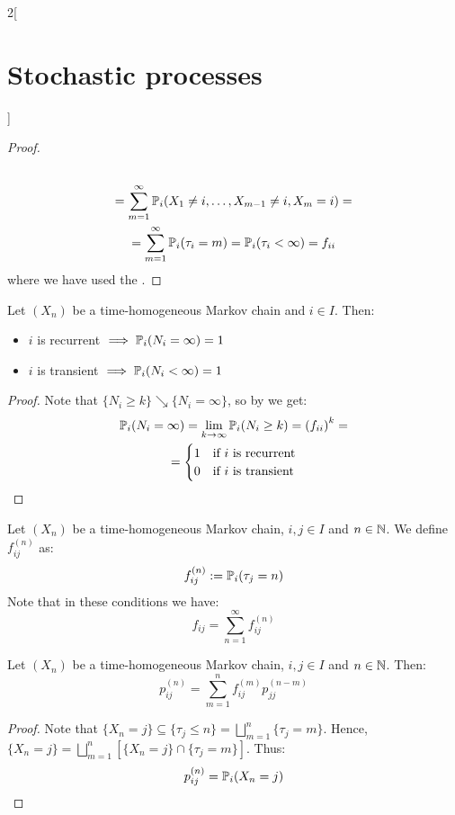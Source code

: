 \documentclass[../../../main_math.tex]{subfiles}
\begin{document}
\begin{multicols}{2}[\section{Stochastic processes}]
\begin{proof}
\begin{multline*}
      \\=\sum_{m=1}^{\infty}\mathbb{P}_i( X_{1}\ne i,\ldots,X_{m-1}\ne i,X_{m}=i)=\\=\sum_{m=1}^{\infty}\mathbb{P}_i(\tau_i=m)=\mathbb{P}_i(\tau_i<\infty)=f_{ii}
    \end{multline*}
    where we have used the .
  \end{proof}
  \begin{theorem}
    Let $(X_n)$ be a time-homogeneous Markov chain and $i\in I$. Then:
    \begin{itemize}
      \item $i$ is recurrent $\implies\mathbb{P}_i(N_i=\infty)=1$
      \item $i$ is transient $\implies\mathbb{P}_i(N_i<\infty)=1$
    \end{itemize}
  \end{theorem}
  \begin{proof}
    Note that $\{N_i\geq k\}\searrow\{N_i=\infty\}$, so by  we get:
    \begin{multline*}
      \mathbb{P}_i(N_i=\infty)=\lim_{k\to\infty}\mathbb{P}_i(N_i\geq k)={(f_{ii})}^k=\\=\begin{cases}
        1 & \text{if }i\text{ is recurrent} \\
        0 & \text{if }i\text{ is transient}
      \end{cases}
    \end{multline*}
  \end{proof}
  \begin{definition}
    Let $(X_n)$ be a time-homogeneous Markov chain, $i, j\in I$ and $n\in\mathbb{N}$. We define $f_{ij}^{(n)}$ as:
    $$f_{ij}^{(n)}:=\mathbb{P}_i(\tau_j=n)$$
    Note that in these conditions we have:
    $$
      f_{ij}=\sum_{n=1}^{\infty}f_{ij}^{(n)}
    $$
  \end{definition}
  \begin{proposition}\label{SP:pij-fij}
    Let $(X_n)$ be a time-homogeneous Markov chain, $i, j\in I$ and $n\in\mathbb{N}$. Then:
    $$
      p_{ij}^{(n)}=\sum_{m=1}^{n} f_{ij}^{(m)}p_{jj}^{(n-m)}
    $$
  \end{proposition}
  \begin{proof}
    Note that $\{X_n=j\}\subseteq \{\tau_j\leq n\}=\bigsqcup_{m=1}^n\{\tau_j=m\}$. Hence, $\{X_n=j\}=\bigsqcup_{m=1}^n[\{X_n=j\}\cap \{\tau_j=m\}]$. Thus:
    \begin{align*}
      p_{ij}^{(n)} & =\Prob_i(X_n=j)                                              \\

\end{align*}
\end{proof}
\end{multicols}
\end{document}
